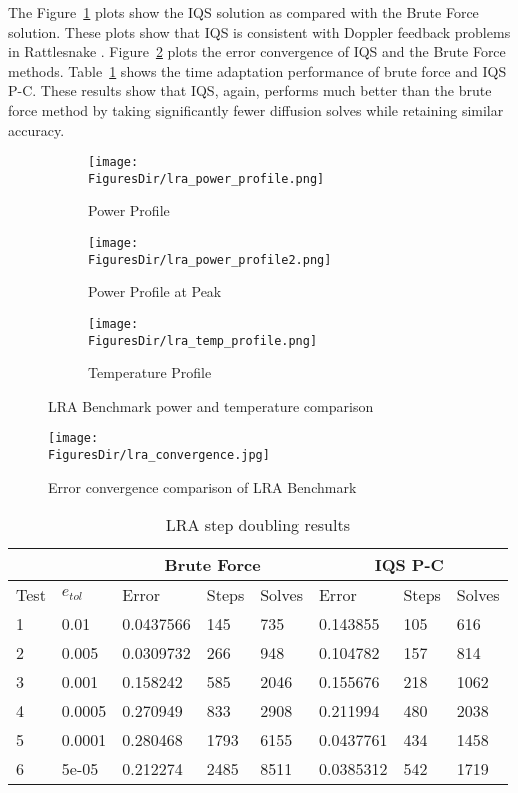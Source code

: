 \documentclass[12pt]{scrartcl}
\newcommand{\rattlesnake}{Rattlesnake }
\newcommand{\fig}[1]{Figure~\ref{#1}}                      %
\newcommand{\tbl}[1]{Table~\ref{#1}}                     %
\newcommand{\FiguresDir}{./figs}
\begin{document}
The \fig{fig:LRA_plots} plots show the IQS  solution as compared with the Brute Force solution.    These plots show that IQS is consistent with Doppler feedback problems in \rattlesnake.  \fig{fig:lra_conv} plots the error convergence of IQS and the Brute Force methods. \tbl{tab:LRAdt2} shows the time adaptation performance of brute force and IQS P-C.  These results show that IQS, again, performs much better than the brute force method by taking significantly fewer diffusion solves while retaining similar accuracy.

\begin{figure}[!htbp]
\begin{center}
\begin{subfigure}[!htbp]{0.49\textwidth}
\texttt{[image: \\FiguresDir/lra\_power\_profile.png]}
\caption{Power Profile}
\end{subfigure}
\begin{subfigure}[!htbp]{0.49\textwidth}
\texttt{[image: \\FiguresDir/lra\_power\_profile2.png]}
\caption{Power Profile at Peak}
\end{subfigure}
\begin{subfigure}[!htbp]{0.49\textwidth}
\texttt{[image: \\FiguresDir/lra\_temp\_profile.png]}
\caption{Temperature Profile}
\end{subfigure}
\caption{LRA Benchmark power and temperature comparison}
\label{fig:LRA_plots}
\end{center}
\end{figure}

\begin{figure}[!htbp]
\centering
\texttt{[image: \\FiguresDir/lra\_convergence.jpg]}
\caption{Error convergence comparison of LRA Benchmark}
\label{fig:lra_conv}
\end{figure}

\begin{table}[!htbp]
\caption{LRA step doubling results}
\label{tab:LRAdt2}
\begin{center}
\begin{tabular}{|l|l|l|l|l|l|l|l|}
\hline
  &  & \multicolumn{3}{|c|}{Brute Force} & \multicolumn{3}{|c|}{IQS P-C} \\
\hline
Test & $e_{tol}$ & Error & Steps & Solves & Error & Steps & Solves \\
\hline
1 &	 0.01 &	 0.0437566 &	 145 &	 735 &	 0.143855 &	 105 &	 616 \\ 
2 &	 0.005 &	 0.0309732 &	 266 &	 948 &	 0.104782 &	 157 &	 814 \\ 
3 &	 0.001 &	 0.158242 &	 585 &	 2046 &	 0.155676 &	 218 &	 1062 \\ 
4 &	 0.0005 &	 0.270949 &	 833 &	 2908 &	 0.211994 &	 480 &	 2038 \\ 
5 &	 0.0001 &	 0.280468 &	 1793 &	 6155 &	 0.0437761 &	 434 &	 1458 \\ 
6 &	 5e-05 &	 0.212274 &	 2485 &	 8511 &	 0.0385312 &	 542 &	 1719 \\ 
\hline
\end{tabular}
\end{center}
\end{table}
\end{document}

